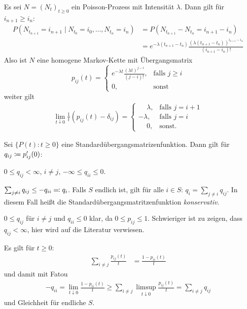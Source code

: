 \documentclass[a4paper,twoside,DIV15,BCOR12mm]{scrbook}
\begin{document}
\begin{beispiel}
Es sei $N=(N_t)_{t\ge 0}$ ein Poisson-Prozess mit Intensität $\lambda$. Dann gilt für $i_{n+1}\ge i_n$:
\begin{align*}
P(N_{t_{n+1}} = i_{n+1} \mid N_{t_0} = i_0 ,\ldots,N_{t_n}=i_n)
&= P(N_{t_{n+1}} - N_{t_n} = i_{n+1} - i_n)\\
&= e^{-\lambda (t_{n+1}-t_n)}\frac{(\lambda(t_{n+1}-t_n))^{i_{n+1}-i_n}}{(i_{n+1}-i_n)!}
\end{align*}
Also ist $N$ eine homogene Markov-Kette mit Übergangsmatrix
\[
p_{ij}(t) = 
\begin{cases}
e^{-\lambda t}\frac{(\lambda t)^{j-i}}{(j-i)!}, &\text{falls }j\ge i \\
0,&\text{sonst}
\end{cases}
\]
weiter gilt 
\begin{align*}
\lim_{t\downarrow 0} \frac 1t(p_{ij}(t) - \delta_{ij}) =
\begin{cases}
\phantom{-}\lambda,&\text{falls }j=i+1 \\
-\lambda, &\text{falls }j=i \\
\phantom{-}0, &\text{sonst.}
\end{cases}
\end{align*}
\end{beispiel}

\begin{lemma}
Sei $\{P(t):t\ge 0\}$ eine Standardübergangsmatrizenfunktion. Dann gilt für $q_{ij} \da p_{ij}'(0)$:
\begin{enuma}
\item $0\le q_{ij} < \infty$, $i\ne j$, $-\infty \le  q_{ii} \le 0$.
\item $\sum_{j\ne i} q_{ij} \le -q_{ii} \ad q_i$. Falls $S$ endlich ist, gilt für alle $i\in S$: $q_i = \sum_{j\ne i} q_{ij}$. In diesem Fall heißt die Standardübergangsmatritzenfunktion \emph{konservativ}.
\end{enuma}
\end{lemma}

\begin{beweis}
\begin{enuma}
\item $0\le q_{ij}$ für $i\ne j$ und $q_{ii} \le 0$ klar, da $0\le p_{ij} \le 1$. Schwieriger ist zu zeigen, dass $q_{ij}<\infty$, hier wird auf die Literatur verwiesen.
\item  Es gilt für $t\ge 0$:
\begin{align*}
\sum_{i\ne j} \frac {p_{ij}(t)}t &= \frac{1-p_{ii}(t)}t 
\end{align*}
und damit mit Fatou
\begin{align*}
-q_{ii} = \lim_{t\downarrow 0}  \frac{1-p_{ii}(t)}t 
\ge \sum_{i\ne j} \limsup_{t\downarrow 0} \frac{p_{ij}(t)}{t} = \sum_{i\ne j} q_{ij}
\end{align*}
und Gleichheit für endliche $S$.
\end{enuma}
\end{beweis}
\end{document}
